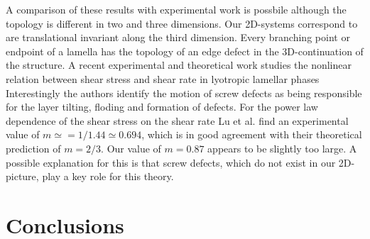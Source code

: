 \documentclass[8.5pt,twoside,twocolumn]{article}
\begin{document}
A comparison of these results with experimental work is possbile although the topology is different in two and three dimensions.
Our 2D-systems correspond to are translational invariant along the third dimension.
Every branching point or endpoint of a lamella has the topology of an edge defect in the 3D-continuation of the structure.
A recent experimental and theoretical work studies the nonlinear relation between shear stress and shear rate in lyotropic lamellar phases \cite{Lu08}
Interestingly the authors identify the motion of screw defects as being responsible for the layer tilting, floding  and formation of defects. 
For the power law dependence of the shear stress on the shear rate Lu et al. find an experimental value of $m\simeq=1/1.44\simeq 0.694$, which is in good agreement with their theoretical prediction of $m=2/3$.
Our value of $m=0.87$ appears to be slightly too large.
A possible explanation for this is that screw defects, which do not exist in our 2D-picture, play a key role for this theory.\\

\section{Conclusions}
\end{document}

